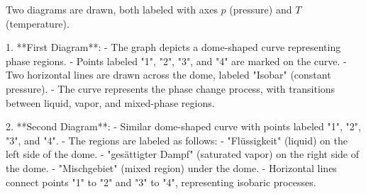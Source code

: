 Two diagrams are drawn, both labeled with axes \( p \) (pressure) and \( T \) (temperature).  

1. **First Diagram**:  
   - The graph depicts a dome-shaped curve representing phase regions.  
   - Points labeled "1", "2", "3", and "4" are marked on the curve.  
   - Two horizontal lines are drawn across the dome, labeled "Isobar" (constant pressure).  
   - The curve represents the phase change process, with transitions between liquid, vapor, and mixed-phase regions.  

2. **Second Diagram**:  
   - Similar dome-shaped curve with points labeled "1", "2", "3", and "4".  
   - The regions are labeled as follows:  
     - "Flüssigkeit" (liquid) on the left side of the dome.  
     - "gesättigter Dampf" (saturated vapor) on the right side of the dome.  
     - "Mischgebiet" (mixed region) under the dome.  
   - Horizontal lines connect points "1" to "2" and "3" to "4", representing isobaric processes.